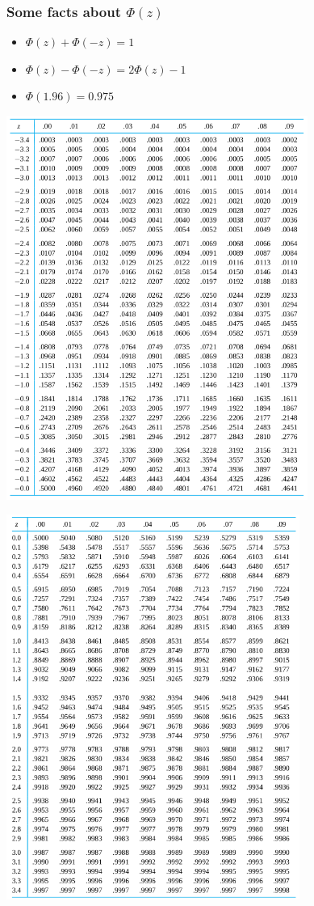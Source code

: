 \documentclass[handout]{beamer}\usepackage[]{graphicx}\usepackage[]{color}
\numberwithin{equation}{section}
\begin{document}
\begin{frame}
\frametitle{Some facts about $\Phi(z)$}
\begin{itemize}
\item
$\Phi(z) + \Phi(-z) = 1$
\item
$\Phi(z) - \Phi(-z) = 2 \Phi(z)  -1 $
\item
$\Phi(1.96) = 0.975$
\end{itemize}
\end{frame}

\begin{frame}[b]
\includegraphics[width = 0.74\textwidth]{B3_1.png}
\end{frame}

\begin{frame}[b]
\includegraphics[width = 0.72\textwidth]{B3_2.png}
\end{frame}
\end{document}
